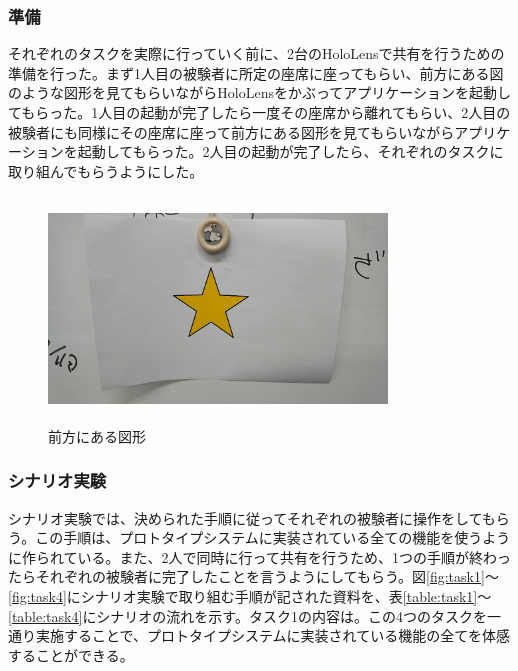 \documentclass[11pt,a4j, titlepage]{jarticle} %
\begin{document}
\subsubsection{準備}
それぞれのタスクを実際に行っていく前に、2台のHoloLensで共有を行うための準備を行った。まず1人目の被験者に所定の座席に座ってもらい、前方にある図のような図形を見てもらいながらHoloLensをかぶってアプリケーションを起動してもらった。1人目の起動が完了したら一度その座席から離れてもらい、2人目の被験者にも同様にその座席に座って前方にある図形を見てもらいながらアプリケーションを起動してもらった。2人目の起動が完了したら、それぞれのタスクに取り組んでもらうようにした。

\begin{figure}[H]
  \begin{center}
    \includegraphics[clip,height=6.0cm,width=9.0cm]{./hoshi.eps}
    \caption{前方にある図形}
    \label{fig:hoshi}
  \end{center}
\end{figure}

\subsubsection{シナリオ実験}
シナリオ実験では、決められた手順に従ってそれぞれの被験者に操作をしてもらう。この手順は、プロトタイプシステムに実装されている全ての機能を使うように作られている。また、2人で同時に行って共有を行うため、1つの手順が終わったらそれぞれの被験者に完了したことを言うようにしてもらう。図\ref{fig:task1}～\ref{fig:task4}にシナリオ実験で取り組む手順が記された資料を、表\ref{table:task1}～\ref{table:task4}にシナリオの流れを示す。タスク1の内容は。この4つのタスクを一通り実施することで、プロトタイプシステムに実装されている機能の全てを体感することができる。
\end{document}
